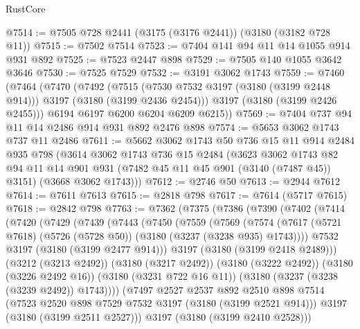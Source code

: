 \begin{lexlean}{RustCore}
\begin{coremodule}
@7514 := @7505 @728 @2441 (@3175 (@3176 @2441)) (@3180 (@3182 @728 @11))
@7515 := @7502 @7514
@7523 := @7404 @141 @94 @11 @14 @1055 @914 @931 @892
@7525 := @7523 @2447 @898
@7529 := @7505 @140 @1055 @3642 @3646
@7530 := @7525 @7529
@7532 := @3191 @3062 @1743
@7559 := @7460
    (@7464
      (@7470
        (@7492
          (@7515 (@7530 @7532 @3197 (@3180 (@3199 @2448 @914))) @3197 (@3180 (@3199 @2436 @2454)))
          @3197
          (@3180 (@3199 @2426 @2455)))
        @6194
        @6197
        @6200
        @6204
        @6209
        @6215))
@7569 := @7404 @737 @94 @11 @14 @2486 @914 @931 @892 @2476 @898
@7574 := @5653 @3062 @1743 @737 @11 @2486
@7611 := @5662
    @3062
    @1743
    @50
    @736
    @15
    @11
    @914
    @2484
    @935
    @798
    (@3614
      @3062
      @1743
      @736
      @15
      @2484
      (@3623
        @3062
        @1743
        @82
        @94
        @11
        @14
        @901
        @931
        (@7482 @45 @11 @45 @901 (@3140 (@7487 @45)) @3151)
        (@3668 @3062 @1743)))
@7612 := @2746 @50
@7613 := @2944 @7612
@7614 := @7611 @7613
@7615 := @2818 @798
@7617 := @7614 (@5717 @7615)
@7618 := @2842 @798
@7763 := @7362
    (@7375
      (@7386
        (@7390
          (@7402
            (@7414
              (@7420
                (@7429
                  (@7439
                    (@7443
                      (@7450
                        (@7559
                          (@7569
                            (@7574
                              (@7617
                                (@5721 @7618)
                                (@5726 (@5728 @50))
                                (@3180 (@3237 (@3238 @935) @1743))))
                            @7532
                            @3197
                            (@3180 (@3199 @2477 @914)))
                          @3197
                          (@3180 (@3199 @2418 @2489)))
                        (@3212 (@3213 @2492))
                        (@3180 (@3217 @2492))
                        (@3180 (@3222 @2492))
                        (@3180 (@3226 @2492 @16))
                        (@3180 (@3231 @722 @16 @11))
                        (@3180 (@3237 (@3238 (@3239 @2492)) @1743))))
                    (@7497
                      @2527
                      @2537
                      @892
                      @2510
                      @898
                      @7514
                      (@7523 @2520 @898 @7529 @7532 @3197 (@3180 (@3199 @2521 @914)))
                      @3197
                      (@3180 (@3199 @2511 @2527)))
                    @3197
                    (@3180 (@3199 @2410 @2528)))

\end{coremodule}
\end{lexlean}
